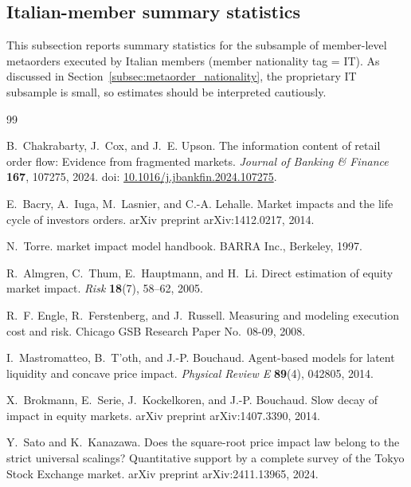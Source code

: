\documentclass[11pt]{article}
\begin{document}
\FloatBarrier

\subsection{Italian-member summary statistics}
\label{app:it_member_summary_statistics}
This subsection reports summary statistics for the subsample of member-level metaorders executed by Italian members
(member nationality tag = IT). As discussed in Section~\ref{subsec:metaorder_nationality}, the proprietary IT
subsample is small, so estimates should be interpreted cautiously.


\FloatBarrier

\begin{thebibliography}{99}

B.~Chakrabarty, J.~Cox, and J.~E. Upson.
\newblock The information content of retail order flow: Evidence from fragmented markets.
\newblock \emph{Journal of Banking \& Finance} \textbf{167}, 107275, 2024.
\newblock doi: \href{https://doi.org/10.1016/j.jbankfin.2024.107275}{10.1016/j.jbankfin.2024.107275}.


E.~Bacry, A.~Iuga, M.~Lasnier, and C.-A. Lehalle.
\newblock Market impacts and the life cycle of investors orders.
\newblock arXiv preprint arXiv:1412.0217, 2014.

N.~Torre.
 market impact model handbook.
\newblock BARRA Inc., Berkeley, 1997.

R.~Almgren, C.~Thum, E.~Hauptmann, and H.~Li.
\newblock Direct estimation of equity market impact.
\newblock \emph{Risk} \textbf{18}(7), 58--62, 2005.

R.~F. Engle, R.~Ferstenberg, and J.~Russell.
\newblock Measuring and modeling execution cost and risk.
\newblock Chicago GSB Research Paper No.~08-09, 2008.

I.~Mastromatteo, B.~T{'o}th, and J.-P. Bouchaud.
\newblock Agent-based models for latent liquidity and concave price impact.
\newblock \emph{Physical Review E} \textbf{89}(4), 042805, 2014.

X.~Brokmann, E.~Serie, J.~Kockelkoren, and J.-P. Bouchaud.
\newblock Slow decay of impact in equity markets.
\newblock arXiv preprint arXiv:1407.3390, 2014.

Y.~Sato and K.~Kanazawa.
\newblock Does the square-root price impact law belong to the strict universal scalings? Quantitative support by a complete survey of the Tokyo Stock Exchange market.
\newblock arXiv preprint arXiv:2411.13965, 2024.


\end{thebibliography}
\end{document}
